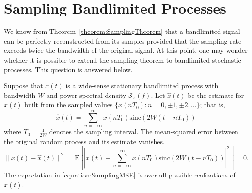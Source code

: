 \section{Sampling Bandlimited Processes}

We know from Theorem~\ref{theorem:SamplingTheorem} that a bandlimited signal can be perfectly reconstructed from its samples provided that the sampling rate exceeds twice the bandwidth of the original signal.
At this point, one may wonder whether it is possible to extend the sampling theorem to bandlimited stochastic processes.
This question is answered below.

\begin{theorem} \label{theorem:SamplingRandomSignals}
Suppose that $x(t)$ is a wide-sense stationary bandlimited process with bandwidth $W$ and power spectral density $\mathcal{S}_x (f)$.
Let $\hat{x}(t)$ be the estimate for $x(t)$ built from the sampled values $\{ x(nT_0) : n = 0, \pm 1, \pm 2, \ldots \}$; that is,
\begin{equation*}
\hat{x}(t) = \sum_{n=-\infty}^{\infty} x(nT_0) \mathrm{sinc} (2 W (t - nT_0))
\end{equation*}
where $T_0 = \frac{1}{2W}$ denotes the sampling interval.
The mean-squared error between the original random process and its estimate vanishes,
\begin{equation} \label{equation:SamplingMSE}
\| x(t) - \hat{x}(t) \|^2
= \mathrm{E} \left[ \left| x(t) - \sum_{n=-\infty}^{\infty}
x(nT_0) \mathrm{sinc} (2 W (t - nT_0)) \right|^2 \right] = 0 .
\end{equation}
The expectation in \eqref{equation:SamplingMSE} is over all possible realizations of $x(t)$.
\end{theorem}

